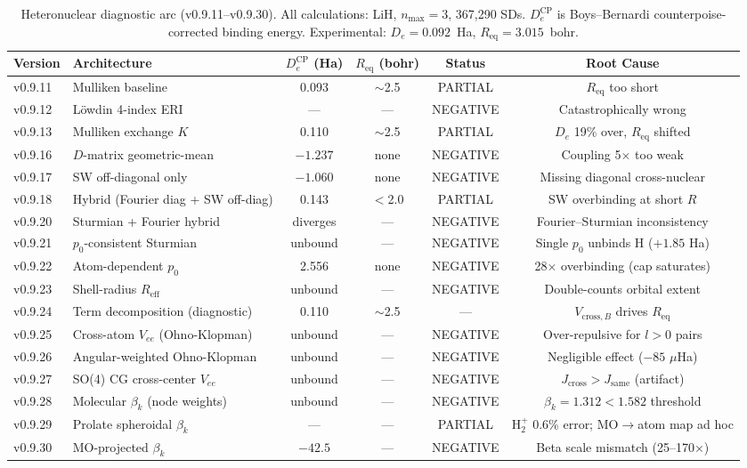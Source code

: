 \documentclass[aps,pra,twocolumn,superscriptaddress,longbibliography,floatfix]{revtex4-2}
\begin{document}
\begin{table}[!htbp]
\centering
\caption{\label{tab:diagnostic_arc}%
Heteronuclear diagnostic arc (v0.9.11--v0.9.30).
All calculations: LiH, $n_{\max}=3$, 367{,}290 SDs.
$D_e^{\text{CP}}$ is Boys--Bernardi counterpoise-corrected binding energy.
Experimental: $D_e = 0.092$~Ha, $R_{\text{eq}} = 3.015$~bohr.}
\begin{tabular}{llcccc}
\hline
Version & Architecture & $D_e^{\text{CP}}$ (Ha) & $R_{\text{eq}}$ (bohr) & Status & Root Cause \\
\hline
v0.9.11 & Mulliken baseline & 0.093 & $\sim$2.5 & PARTIAL & $R_{\text{eq}}$ too short \\
v0.9.12 & L\"owdin 4-index ERI & --- & --- & NEGATIVE & Catastrophically wrong \\
v0.9.13 & Mulliken exchange $K$ & 0.110 & $\sim$2.5 & PARTIAL & $D_e$ 19\% over, $R_{\text{eq}}$ shifted \\
v0.9.16 & $D$-matrix geometric-mean & $-1.237$ & none & NEGATIVE & Coupling 5$\times$ too weak \\
v0.9.17 & SW off-diagonal only & $-1.060$ & none & NEGATIVE & Missing diagonal cross-nuclear \\
v0.9.18 & Hybrid (Fourier diag + SW off-diag) & 0.143 & $<$2.0 & PARTIAL & SW overbinding at short $R$ \\
v0.9.20 & Sturmian + Fourier hybrid & diverges & --- & NEGATIVE & Fourier--Sturmian inconsistency \\
v0.9.21 & $p_0$-consistent Sturmian & unbound & --- & NEGATIVE & Single $p_0$ unbinds H ($+1.85$ Ha) \\
v0.9.22 & Atom-dependent $p_0$ & 2.556 & none & NEGATIVE & 28$\times$ overbinding (cap saturates) \\
v0.9.23 & Shell-radius $R_{\text{eff}}$ & unbound & --- & NEGATIVE & Double-counts orbital extent \\
v0.9.24 & Term decomposition (diagnostic) & 0.110 & $\sim$2.5 & --- & $V_{\text{cross},B}$ drives $R_{\text{eq}}$ \\
v0.9.25 & Cross-atom $V_{ee}$ (Ohno-Klopman) & unbound & --- & NEGATIVE & Over-repulsive for $l>0$ pairs \\
v0.9.26 & Angular-weighted Ohno-Klopman & unbound & --- & NEGATIVE & Negligible effect ($-85$ $\mu$Ha) \\
v0.9.27 & SO(4) CG cross-center $V_{ee}$ & unbound & --- & NEGATIVE & $J_{\text{cross}} > J_{\text{same}}$ (artifact) \\
v0.9.28 & Molecular $\beta_k$ (node weights) & unbound & --- & NEGATIVE & $\beta_k = 1.312 < 1.582$ threshold \\
v0.9.29 & Prolate spheroidal $\beta_k$ & --- & --- & PARTIAL & H$_2^+$ 0.6\% error; MO$\to$atom map ad hoc \\
v0.9.30 & MO-projected $\beta_k$ & $-42.5$ & --- & NEGATIVE & Beta scale mismatch (25--170$\times$) \\
\hline
\end{tabular}
\end{table}
\end{document}

